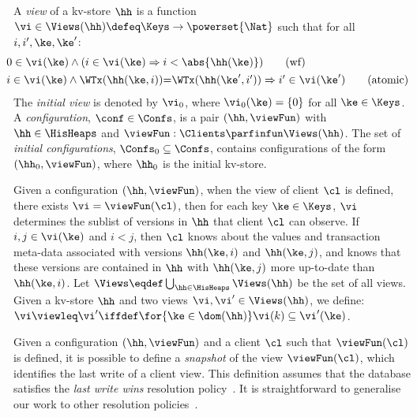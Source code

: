 \begin{definition}[Views]
\label{def:view}
\label{def:cuts}
\label{def:views}
\label{def:configuration}
A \emph{view} of a kv-store $\hh$ is a function
$\vi \in \Views(\hh) \defeq \Keys \to\powerset{\Nat}$ such that for all $i, i', \ke, \ke'$:
\begin{align}
    & \hspace*{-8pt}
    0 \in \vi(\ke) 
    \wedge (i \in \vi(\ke) \Rightarrow i < \abs{ \hh(\ke) }) 
    \tag{wf}
    \label{eq:view.wf}\\
    & \hspace*{-8pt}
    \begin{array}{@{}l@{}}
	i \in \vi(\ke)  
  	\land \WTx(\hh(\ke, i)) {=} \WTx(\hh(\ke', i'))  
  	\Rightarrow i' \in \vi(\ke')
    \end{array}
	\tag{atomic}
	\label{eq:view.atomic}
\end{align}
The \emph{initial view} is denoted by $\vi_{0}$, where $\vi_{0}(\ke) = \{0\}$ for all $\ke \in \Keys$. 
A \emph{configuration}, $\conf \in \Confs$,  is a pair $ (\hh, \viewFun)$
with $\hh \in \HisHeaps$ and
$\viewFun : \Clients \parfinfun \Views(\hh)$. 
The set of \emph{initial configurations}, $\Confs_0 \subseteq \Confs$, contains configurations of the form $ (\hh_0, \viewFun)$, where $\hh_0$ is the initial kv-store. 
\end{definition}
%


Given a configuration $(\hh, \viewFun)$, when the view of client 
$\cl$ is defined, \ie there exists $\vi = \viewFun(\cl)$, then for each key $\ke \in \Keys$, 
$\vi$ determines the sublist of versions in $\hh$ that client $\cl$ can observe. 
If $i,j \in \vi(\ke)$ and $i < j$, then $\cl$ knows about the values and 
transaction meta-data associated with versions $\hh(\ke, i)$ and  $\hh(\ke, j)$, 
and  knows that these versions are contained in $\hh$ with  $\hh(\ke, j)$ more 
up-to-date than $\hh(\ke, i)$. 
Let $\Views \eqdef \bigcup_{\hh \in \HisHeaps} \Views(\hh)$ be the set of all views. 
Given a kv-store $\hh$ and two views $\vi, \vi' \in \Views(\hh)$, 
we define: $\vi \viewleq \vi' \iffdef \for{\ke \in \dom(\hh)} \vi(k) \subseteq \vi'(\ke)$.

Given a configuration $(\hh, \viewFun)$ and a client $\cl$ such that $\viewFun(\cl)$ is
defined, it is possible to define a \emph{snapshot} of the
view $\viewFun  (\cl)$, which identifies the last write of a client
view. This definition assumes that the database satisfies the \emph{last write wins}
resolution policy~\cite{}. It  is straightforward to generalise our work
to other resolution policies~\cite{.}.

